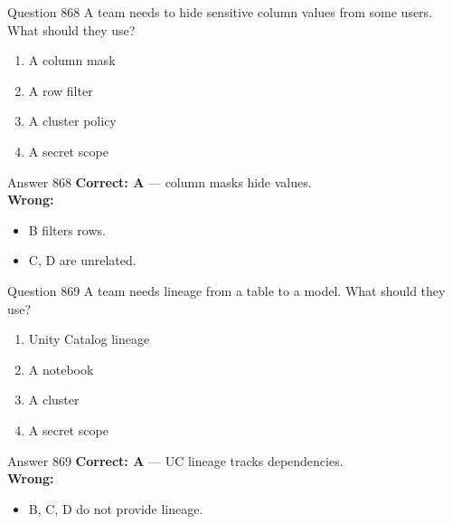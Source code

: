 \documentclass[aspectratio=169,11pt]{beamer}
\begin{document}
	\begin{frame}{Question 868}
		A team needs to hide sensitive column values from some users. What should they use?
		\begin{enumerate}[label=\Alph*.]
			\item A column mask
			\item A row filter
			\item A cluster policy
			\item A secret scope
		\end{enumerate}
	\end{frame}
	\begin{frame}{Answer 868}
		\textbf{Correct: A} --- column masks hide values.\\
		\vspace{0.5em}
		\textbf{Wrong:}
		\begin{itemize}
			\item B filters rows.
			\item C, D are unrelated.
		\end{itemize}
	\end{frame}
	
	\begin{frame}{Question 869}
		A team needs lineage from a table to a model. What should they use?
		\begin{enumerate}[label=\Alph*.]
			\item Unity Catalog lineage
			\item A notebook
			\item A cluster
			\item A secret scope
		\end{enumerate}
	\end{frame}
	\begin{frame}{Answer 869}
		\textbf{Correct: A} --- UC lineage tracks dependencies.\\
		\vspace{0.5em}
		\textbf{Wrong:}
		\begin{itemize}
			\item B, C, D do not provide lineage.
		\end{itemize}
	\end{frame}
	
\end{document}

